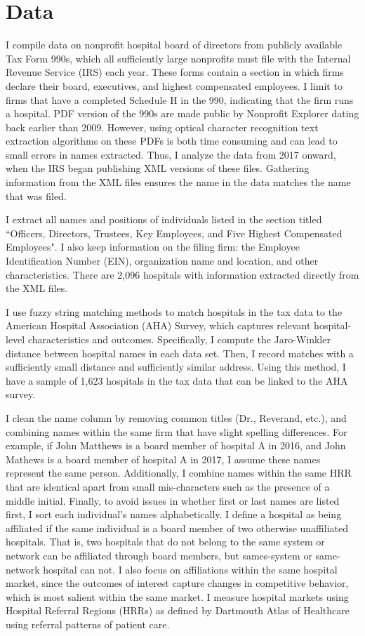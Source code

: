 \documentclass[12pt]{article}
\begin{document}
    \section{Data}

    
   I compile data on nonprofit hospital board of directors from publicly available Tax Form 990s, which all sufficiently large nonprofits must file with the Internal Revenue Service (IRS) each year. These forms contain a section in which firms declare their board, executives, and highest compensated employees. I limit to firms that have a completed Schedule H in the 990, indicating that the firm runs a hospital. PDF version of the 990s are made public by Nonprofit Explorer dating back earlier than 2009. However, using optical character recognition text extraction algorithms on these PDFs is both time consuming and can lead to small errors in names extracted. Thus, I analyze the data from 2017 onward, when the IRS began publishing XML versions of these files. Gathering information from the XML files ensures the name in the data matches the name that was filed.

   I extract all names and positions of individuals listed in the section titled ``Officers, Directors, Trustees, Key Employees, and Five Highest Compensated Employees". I also keep information on the filing firm: the Employee Identification Number (EIN), organization name and location, and other characteristics. There are 2,096 hospitals with information extracted directly from the XML files. 

   I use fuzzy string matching methods to match hospitals in the tax data to the American Hospital Association (AHA) Survey, which captures relevant hospital-level characteristics and outcomes. Specifically, I compute the Jaro-Winkler distance between hospital names in each data set. Then, I record matches with a sufficiently small distance and sufficiently similar address. Using this method, I have a sample of 1,623 hospitals in the tax data that can be linked to the AHA survey. 

    I clean the name column by removing common titles (Dr., Reverand, etc.), and combining names within the same firm that have slight spelling differences. For example, if John Matthews is a board member of hospital A in 2016, and John Mathews is a board member of hospital A in 2017, I assume these names represent the same person. Additionally, I combine names within the same HRR that are identical apart from small mis-characters such as the presence of a middle initial. Finally, to avoid issues in whether first or last names are listed first, I sort each individual's names alphabetically. I define a hospital as being affiliated if the same individual is a board member of two otherwise unaffiliated hospitals. That is, two hospitals that do not belong to the same system or network can be affiliated through board members, but sames-system or same-network hospital can not. I also focus on affiliations within the same hospital market, since the outcomes of interest capture changes in competitive behavior, which is most salient within the same market. I measure hospital markets using Hospital Referral Regions (HRRs) as defined by Dartmouth Atlas of Healthcare using referral patterns of patient care. 
\end{document}
